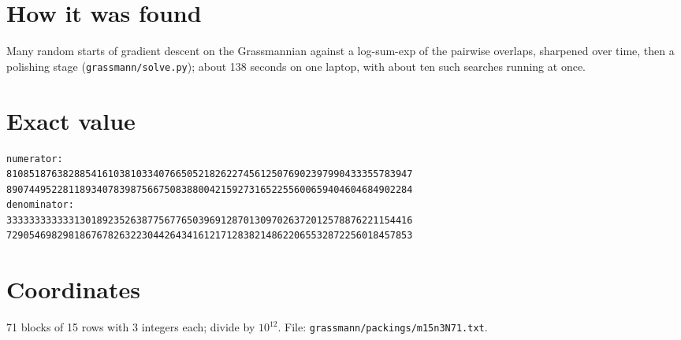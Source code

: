 \documentclass[11pt,a4paper]{article}
\begin{document}
\section{How it was found}
Many random starts of gradient descent on the Grassmannian against a log-sum-exp of the pairwise overlaps, sharpened over time, then a polishing stage (\texttt{grassmann/solve.py}); about 138 seconds on one laptop, with about ten such searches running at once.


\appendix
\section{Exact value}
{\small
\begin{verbatim}
numerator:
810851876382885416103810334076650521826227456125076902397990433355783947
890744952281189340783987566750838800421592731652255600659404604684902284
denominator:
333333333333130189235263877567765039691287013097026372012578876221154416
729054698298186767826322304426434161217128382148622065532872256018457853
\end{verbatim}}

\section{Coordinates}
71 blocks of 15 rows with 3 integers each; divide by $10^{12}$. File: \texttt{grassmann/packings/m15n3N71.txt}.
{\tiny
\begin{multicols}{3}
\end{multicols}}
\end{document}

